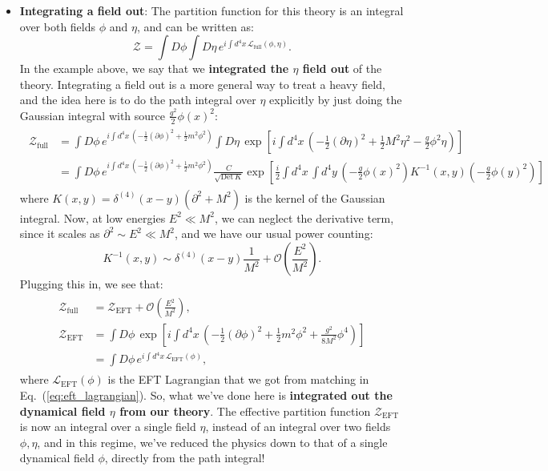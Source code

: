 \documentclass[12pt, oneside]{article}   	%
\theoremstyle{definition}
\begin{document}
\begin{itemize}
	\item \textbf{Integrating a field out}: The partition function for this theory is an integral over both fields $\phi$ and $\eta$, and can be written as:
	\begin{equation}
		\mathcal Z = \int D\phi \int D\eta\, e^{i\int d^4 x\, \mathcal L_\mathrm{full}(\phi, \eta)}.
	\end{equation}
	In the example above, we say that we \textbf{integrated the $\eta$ field out} of the theory. Integrating a field out is a more general way to treat a heavy field, and the idea here is to do the path integral over $\eta$ explicitly by just doing the Gaussian integral with source $\frac{g^2}{2} \phi(x)^2$:
	\begin{align} \begin{split}
		\mathcal Z_\mathrm{full} &= \int D\phi\, e^{ i\int d^4 x\, ( -\frac{1}{2} (\partial\phi)^2 + \frac{1}{2} m^2\phi^2)} \int D\eta\, \exp\left[i\int d^4 x \, \left(-\frac{1}{2} (\partial\eta)^2 + \frac{1}{2} M^2 \eta^2 - \frac{g}{2} \phi^2\eta \right) \right] \\
		&= \int D\phi\, e^{ i\int d^4 x\, (-\frac{1}{2} (\partial\phi)^2 + \frac{1}{2} m^2\phi^2)} \frac{C}{\sqrt{\mathrm{Det}\, K}} \exp\left[\frac{i}{2} \int d^4 x\, \int d^4 y\, \left(-\frac{g}{2} \phi(x)^2 \right) K^{-1}(x, y) \left(-\frac{g}{2} \phi(y)^2 \right)\right]
	\end{split} \end{align}
	where $K(x, y) = \delta^{(4)}(x - y) (\partial^2 + M^2)$ is the kernel of the Gaussian integral. Now, at low energies $E^2\ll M^2$, we can neglect the derivative term, since it scales as $\partial^2\sim E^2\ll M^2$, and we have our usual power counting:
	\begin{equation}
		K^{-1}(x, y)\sim \delta^{(4)}(x - y) \frac{1}{M^2} + \mathcal O\left(\frac{E^2}{M^2} \right).
	\end{equation}
	Plugging this in, we see that:
	\begin{align} \begin{split}
		\mathcal Z_\mathrm{full} &= \mathcal Z_\mathrm{EFT} + \mathcal O\left(\frac{E^2}{M^2} \right), \\
		\mathcal Z_\mathrm{EFT} &= \int D\phi\, \exp\left[ i\int d^4 x\, \left( -\frac{1}{2} (\partial\phi)^2 + \frac{1}{2} m^2\phi^2 + \frac{g^2}{8 M^2} \phi^4 \right)\right] \\
		&= \int D\phi\, e^{i\int d^4 x\, \mathcal L_\mathrm{EFT}(\phi)},
	\end{split} \end{align}
	where $\mathcal L_\mathrm{EFT}(\phi)$ is the EFT Lagrangian that we got from matching in Eq.~(\ref{eq:eft_lagrangian}).  So, what we've done here is \textbf{integrated out the dynamical field $\eta$ from our theory}. The effective partition function $\mathcal Z_{\mathrm{EFT}}$ is now an integral over a single field $\eta$, instead of an integral over two fields $\phi, \eta$, and in this regime, we've reduced the physics down to that of a single dynamical field $\phi$, directly from the path integral!
	

\end{itemize}
\end{document}
